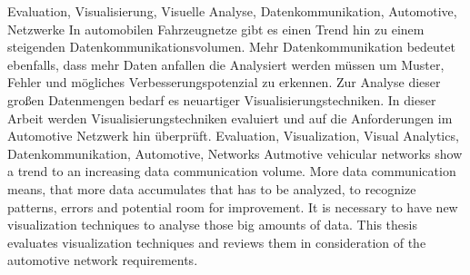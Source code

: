 \documentclass[draft=false
              ,paper=a4
              ,twoside=false
              ,fontsize=11pt
              ,headsepline
              ,BCOR10mm
              ,DIV11
              ]{scrbook}
\begin{document}


\frontmatter

\maketitle

\onehalfspacing

\HAWAbstractPage
{Evaluation, Visualisierung, Visuelle Analyse, Datenkommunikation, Automotive, Netzwerke}%
{In automobilen Fahrzeugnetze gibt es einen Trend hin zu einem steigenden Datenkommunikationsvolumen. Mehr Datenkommunikation bedeutet ebenfalls, dass mehr Daten anfallen die Analysiert werden müssen um Muster, Fehler und mögliches Verbesserungspotenzial zu erkennen. Zur Analyse dieser großen Datenmengen bedarf es neuartiger Visualisierungstechniken. In dieser Arbeit werden Visualisierungstechniken evaluiert und auf die Anforderungen im Automotive Netzwerk hin überprüft.}
{Evaluation, Visualization, Visual Analytics, Datenkommunikation, Automotive, Networks}%
{Autmotive vehicular networks show a trend to an increasing data communication volume. More data communication means, that more data accumulates that has to be analyzed, to recognize patterns, errors and potential room for improvement. It is necessary to have new visualization techniques to analyse those big amounts of data. This thesis evaluates visualization techniques and reviews them in consideration of the automotive network requirements.}

\newpage
\singlespacing

\tableofcontents
\newpage
\listoffigures
\end{document}
